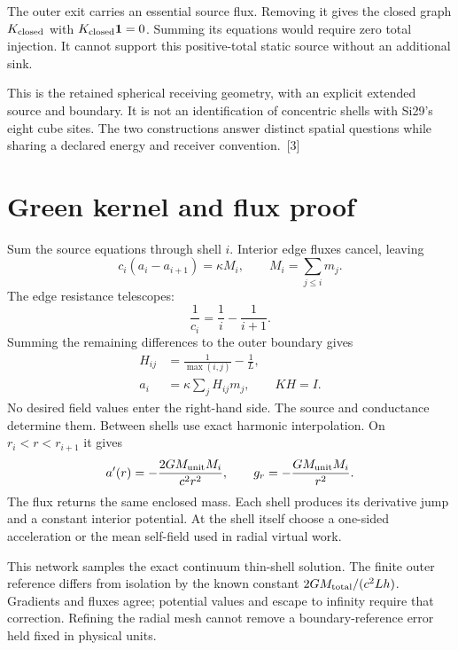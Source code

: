 \documentclass[10pt,twocolumn,letterpaper]{article}
\begin{document}
The outer exit carries an essential source flux. Removing it gives the closed graph $K_{\rm closed}$ with $K_{\rm closed}\mathbf1=0$. Summing its equations would require zero total injection. It cannot support this positive-total static source without an additional sink.

This is the retained spherical receiving geometry, with an explicit extended source and boundary. It is not an identification of concentric shells with Si29's eight cube sites. The two constructions answer distinct spatial questions while sharing a declared energy and receiver convention.~[3]

\section{Green kernel and flux proof}
Sum the source equations through shell $i$. Interior edge fluxes cancel, leaving
\[
c_i(a_i-a_{i+1})=\kappa M_i,\qquad M_i=\sum_{j\leq i}m_j.
\]
The edge resistance telescopes:
\[
\frac1{c_i}=\frac1i-\frac1{i+1}.
\]
Summing the remaining differences to the outer boundary gives
\[
\begin{aligned}
H_{ij}&=\frac1{\max(i,j)}-\frac1L,\\
a_i&=\kappa\sum_j H_{ij}m_j,\qquad KH=I.
\end{aligned}
\]
No desired field values enter the right-hand side. The source and conductance determine them. Between shells use exact harmonic interpolation. On $r_i<r<r_{i+1}$ it gives
\[
a'(r)=-\frac{2GM_{\rm unit}M_i}{c^2r^2},\qquad
g_r=-\frac{GM_{\rm unit}M_i}{r^2}.
\]
The flux returns the same enclosed mass. Each shell produces its derivative jump and a constant interior potential. At the shell itself choose a one-sided acceleration or the mean self-field used in radial virtual work.

This network samples the exact continuum thin-shell solution. The finite outer reference differs from isolation by the known constant $2GM_{\rm total}/(c^2Lh)$. Gradients and fluxes agree; potential values and escape to infinity require that correction. Refining the radial mesh cannot remove a boundary-reference error held fixed in physical units.
\end{document}
